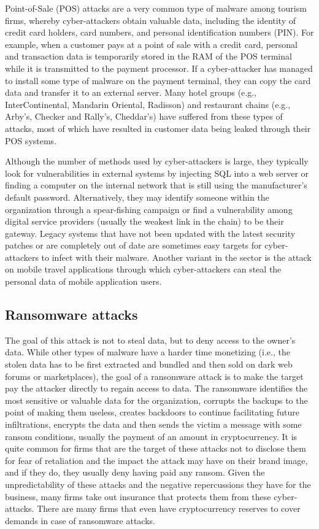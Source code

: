 \documentclass[
  letterpaper,
  DIV=11,
  numbers=noendperiod]{scrreprt}
\begin{document}
Point-of-Sale (POS) attacks are a very common type of malware among
tourism firms, whereby cyber-attackers obtain valuable data, including
the identity of credit card holders, card numbers, and personal
identification numbers (PIN). For example, when a customer pays at a
point of sale with a credit card, personal and transaction data is
temporarily stored in the RAM of the POS terminal while it is
transmitted to the payment processor. If a cyber-attacker has managed to
install some type of malware on the payment terminal, they can copy the
card data and transfer it to an external server. Many hotel groups
(e.g., InterContinental, Mandarin Oriental, Radisson) and restaurant
chains (e.g., Arby's, Checker and Rally's, Cheddar's) have suffered from
these types of attacks, most of which have resulted in customer data
being leaked through their POS systems.

Although the number of methods used by cyber-attackers is large, they
typically look for vulnerabilities in external systems by injecting SQL
into a web server or finding a computer on the internal network that is
still using the manufacturer's default password. Alternatively, they may
identify someone within the organization through a spear-fishing
campaign or find a vulnerability among digital service providers
(usually the weakest link in the chain) to be their gateway. Legacy
systems that have not been updated with the latest security patches or
are completely out of date are sometimes easy targets for
cyber-attackers to infect with their malware. Another variant in the
sector is the attack on mobile travel applications through which
cyber-attackers can steal the personal data of mobile application users.

\hypertarget{ransomware-attacks}{%
\subsection{Ransomware attacks}\label{ransomware-attacks}}

The goal of this attack is not to steal data, but to deny access to the
owner's data. While other types of malware have a harder time monetizing
(i.e., the stolen data has to be first extracted and bundled and then
sold on dark web forums or marketplaces), the goal of a ransomware
attack is to make the target pay the attacker directly to regain access
to data. The ransomware identifies the most sensitive or valuable data
for the organization, corrupts the backups to the point of making them
useless, creates backdoors to continue facilitating future
infiltrations, encrypts the data and then sends the victim a message
with some ransom conditions, usually the payment of an amount in
cryptocurrency. It is quite common for firms that are the target of
these attacks not to disclose them for fear of retaliation and the
impact the attack may have on their brand image, and if they do, they
usually deny having paid any ransom. Given the unpredictability of these
attacks and the negative repercussions they have for the business, many
firms take out insurance that protects them from these cyber-attacks.
There are many firms that even have cryptocurrency reserves to cover
demands in case of ransomware attacks.
\end{document}
